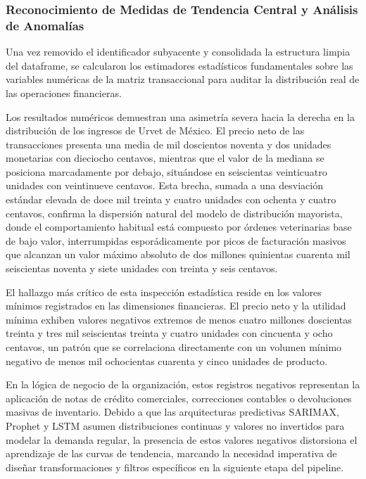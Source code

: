 \documentclass[11pt,a4paper]{report}
\begin{document}
    \subsubsection{Reconocimiento de Medidas de Tendencia Central y Análisis de Anomalías}
    Una vez removido el identificador subyacente y consolidada la estructura limpia del dataframe, se calcularon los
    estimadores estadísticos fundamentales sobre las variables numéricas de la matriz transaccional para auditar
    la distribución real de las operaciones financieras.

    Los resultados numéricos demuestran una asimetría severa hacia la derecha en la distribución de los ingresos de Urvet de México.
    El precio neto de las transacciones presenta una media de mil doscientos noventa y dos unidades monetarias con dieciocho centavos,
    mientras que el valor de la mediana se posiciona marcadamente por debajo, situándose en seiscientas veinticuatro unidades con veintinueve centavos.
    Esta brecha, sumada a una desviación estándar elevada de doce mil treinta y cuatro unidades con ochenta y cuatro centavos, confirma la dispersión
    natural del modelo de distribución mayorista, donde el comportamiento habitual está compuesto por órdenes veterinarias base de bajo valor,
    interrumpidas esporádicamente por picos de facturación masivos que alcanzan un valor máximo absoluto de dos millones quinientas cuarenta mil seiscientas
    noventa y siete unidades con treinta y seis centavos.

    El hallazgo más crítico de esta inspección estadística reside en los valores mínimos registrados en las dimensiones financieras.
    El precio neto y la utilidad mínima exhiben valores negativos extremos de menos cuatro millones doscientas treinta y tres mil seiscientas
    treinta y cuatro unidades con cincuenta y ocho centavos, un patrón que se correlaciona directamente con un volumen mínimo negativo de menos
    mil ochocientas cuarenta y cinco unidades de producto. 

    En la lógica de negocio de la organización, estos registros negativos representan la aplicación de notas de crédito comerciales,
    correcciones contables o devoluciones masivas de inventario. Debido a que las arquitecturas predictivas SARIMAX, Prophet y LSTM asumen distribuciones
    continuas y valores no invertidos para modelar la demanda regular, la presencia de estos valores negativos distorsiona el aprendizaje de las curvas de
    tendencia, marcando la necesidad imperativa de diseñar transformaciones y filtros específicos en la siguiente etapa del pipeline.
\end{document}
